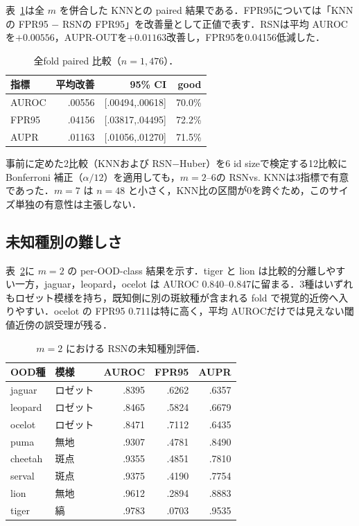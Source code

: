 \documentclass[uplatex,dvipdfmx,a4paper,10pt,twocolumn]{bxjsarticle}
\newcommand{\RSN}{RSN}
\newcommand{\knn}{KNN}
\begin{document}
表~\ref{tab:paired}は全 $m$ を併合した \knn との paired 結果である．FPR95については「\knn の FPR95 $-$ \RSN の FPR95」を改善量として正値で表す．\RSN は平均 AUROCを$+0.00556$，AUPR-OUTを$+0.01163$改善し，FPR95を0.04156低減した．

\begin{table}[t]
\centering
\scriptsize
\caption{全fold paired 比較（$n=1,476$）．}
\label{tab:paired}
\begin{tabular}{lrrr}
\toprule
指標 & 平均改善 & 95\% CI & good\\
\midrule
AUROC & .00556 & [.00494,.00618] & 70.0\%\\
FPR95 & .04156 & [.03817,.04495] & 72.2\%\\
AUPR & .01163 & [.01056,.01270] & 71.5\%\\
\bottomrule
\end{tabular}
\end{table}

事前に定めた2比較（\knn および \RSN$-$Huber）を6 id sizeで検定する12比較に Bonferroni 補正（$\alpha/12$）を適用しても，$m=2$--6の \RSN vs. \knn は3指標で有意であった．$m=7$ は $n=48$ と小さく，\knn 比の区間が0を跨ぐため，このサイズ単独の有意性は主張しない．

\subsection{未知種別の難しさ}

表~\ref{tab:perood}に $m=2$ の per-OOD-class 結果を示す．tiger と lion は比較的分離しやすい一方，jaguar，leopard，ocelot は AUROC 0.840--0.847に留まる．3種はいずれもロゼット模様を持ち，既知側に別の斑紋種が含まれる fold で視覚的近傍へ入りやすい．ocelot の FPR95 0.711は特に高く，平均 AUROCだけでは見えない閾値近傍の誤受理が残る．

\begin{table}[t]
\centering
\scriptsize
\caption{$m=2$ における \RSN の未知種別評価．}
\label{tab:perood}
\begin{tabular}{llrrr}
\toprule
OOD種 & 模様 & AUROC & FPR95 & AUPR\\
\midrule
jaguar  & ロゼット & .8395 & .6262 & .6357\\
leopard & ロゼット & .8465 & .5824 & .6679\\
ocelot  & ロゼット & .8471 & .7112 & .6435\\
puma    & 無地     & .9307 & .4781 & .8490\\
cheetah & 斑点     & .9355 & .4851 & .7810\\
serval  & 斑点     & .9375 & .4190 & .7754\\
lion    & 無地     & .9612 & .2894 & .8883\\
tiger   & 縞       & .9783 & .0703 & .9535\\
\bottomrule
\end{tabular}
\end{table}
\end{document}
